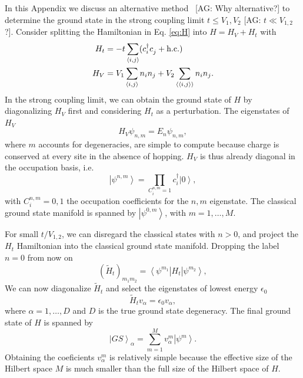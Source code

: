 \documentclass[aps,prx,10pt,twocolumn,floatfix,superscriptaddress,showpacs,numerical,footinbib]{revtex4-1}
\newcommand{\noteAG}[1]{{\color{blue} [AG: #1]}}
\begin{document}
In this Appendix we discuss an alternative method~\noteAG{Why alternative?} to determine the ground state in the strong coupling limit $t\leq V_1,V_2$\noteAG{$t \ll V_{1,2}$?}. 
%
Consider splitting the Hamiltonian in Eq. \eqref{eq:H} into $H =H_V + H_t$ with
\begin{align}
%
 H_t &=-t\sum_{\left\langle i,j\right\rangle}(c^{\dagger}_{i}c^{\vphantom{\dagger}}_{j}+ \mathrm{h.c.}) \\
H_V &= V_{1}\sum_{\left\langle i,j\right\rangle }n_{i}n_{j}+
%
V_{2}\sum_{\left\langle \left\langle i,j\right\rangle \right\rangle }n_{i}n_{j}. 
%
\label{eq:Hsplit}
\end{align}
%
In the strong coupling limit, we can obtain the ground state of $H$ by diagonalizing $H_V$ first and considering $H_t$ as a perturbation. 
%
The eigenstates of $H_V$
\begin{equation}
H_V \psi_{n,m} = E_n \psi_{n,m},
\end{equation}
where $m$ accounts for degeneracies, are simple to compute because charge is conserved at every site in the absence of hopping. 
%
$H_V$ is thus already diagonal in the occupation basis, i.e.
\begin{equation}
\left| \psi^{n,m}\right> = \prod_{C^{n,m}_i = 1} c^\dagger_i \left|0\right>,
\end{equation}
%
 with $C^{n,m}_i=0,1$ the occupation coefficients for the $n,m$ eigenstate. 
The classical ground state manifold is spanned by $\left|\psi^{0,m}\right>$, with $m=1,\dots,M$.   

For small $t/V_{1,2}$, we can disregard the classical states with $n>0$, and project the $H_t$ Hamiltonian into the classical ground state manifold. 
%
Dropping the label $n=0$ from now on
%
\begin{equation}
(\tilde{H}_t)_{m_1m_2} =  \left< \psi^{m_1} \right| H_t \left| \psi^{m_2} \right>,
\end{equation}
%
We can now diagonalize $\tilde{H}_t$ and select the eigenstates of lowest energy $\epsilon_0$
%
\begin{equation}
\tilde{H}_t v_\alpha = \epsilon_0 v_\alpha,
\end{equation}
%
where $\alpha = 1,\ldots,D$ and $D$ is the true ground state degeneracy. The final ground state of $H$ is spanned by
%
\begin{equation}
\left| GS\right>_\alpha = \sum_{m=1}^M v^m_\alpha \left| \psi^m\right>.
\end{equation}
%
Obtaining the coeficients $v^m_\alpha$ is relatively simple because the effective size of the Hilbert space $M$ is much smaller than the full size of the Hilbert space of $H$.
\end{document}
